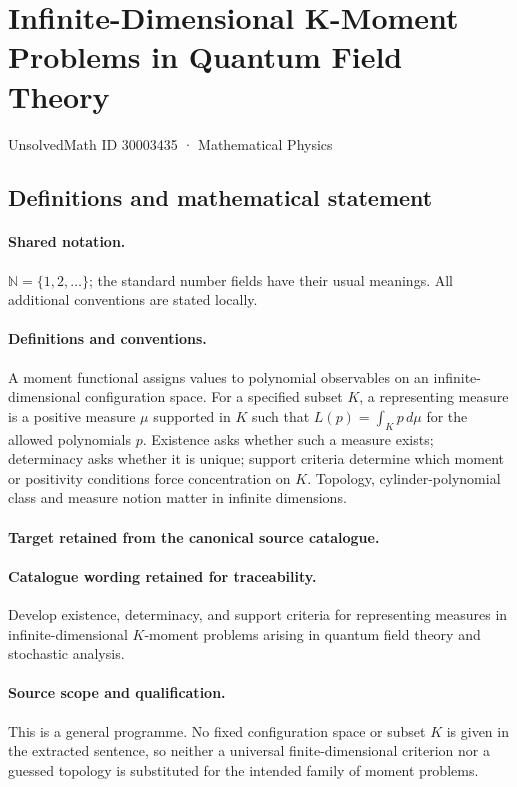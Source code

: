 \documentclass[11pt]{article}
\begin{document}
\setcounter{section}{30003434}
\section{Infinite-Dimensional K-Moment Problems in Quantum Field Theory}\label{30003435}
{\small UnsolvedMath ID 30003435 · Mathematical Physics}
\subsection{Definitions and mathematical statement}

\paragraph{Shared notation.}$\mathbb N=\{1,2,\ldots\}$; the standard number fields have their usual meanings. All additional conventions are stated locally.


\paragraph{Definitions and conventions.}
A moment functional assigns values to polynomial observables on an infinite-dimensional configuration space. For a specified subset $K$, a representing measure is a positive measure $\mu$ supported in $K$ such that $L(p)=\int_K p\,d\mu$ for the allowed polynomials $p$. Existence asks whether such a measure exists; determinacy asks whether it is unique; support criteria determine which moment or positivity conditions force concentration on $K$. Topology, cylinder-polynomial class and measure notion matter in infinite dimensions.

\paragraph{Target retained from the canonical source catalogue.}
\paragraph{Catalogue wording retained for traceability.}
Develop existence, determinacy, and support criteria for representing measures in infinite-dimensional $K$-moment problems arising in quantum field theory and stochastic analysis.

\paragraph{Source scope and qualification.}
This is a general programme. No fixed configuration space or subset $K$ is given in the extracted sentence, so neither a universal finite-dimensional criterion nor a guessed topology is substituted for the intended family of moment problems.
\end{document}
